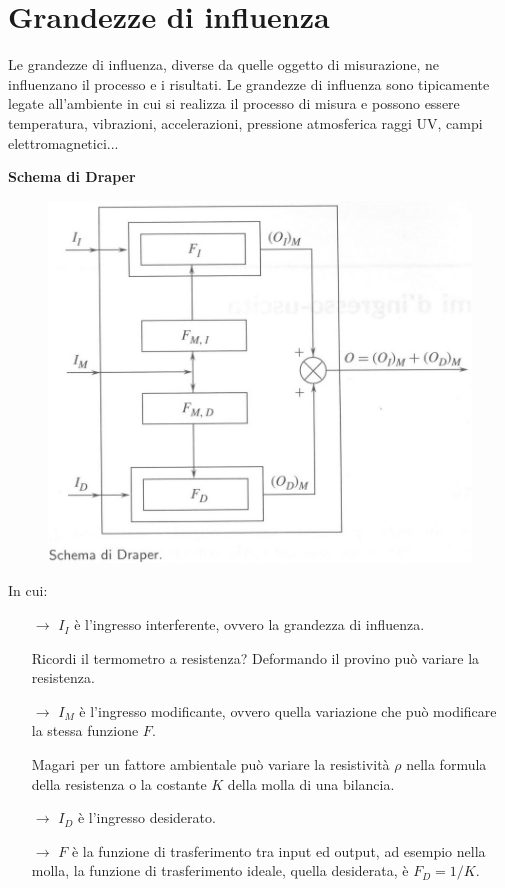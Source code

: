 \documentclass[a4paper, 15pt]{article}
\begin{document}
\section{Grandezze di influenza}	
\begin{adjustwidth}{2in}{}
	Le grandezze di influenza, diverse da quelle oggetto di misurazione, ne
	influenzano il processo e i risultati. 
	Le grandezze di influenza sono tipicamente legate all'ambiente in cui si
	realizza il processo di misura e possono essere temperatura, vibrazioni, accelerazioni, pressione atmosferica raggi UV, campi elettromagnetici... \newline 
	
	\textbf{Schema di Draper}  
	\begin{figure}[H]
		\centering
		\includegraphics[width=0.5\linewidth]{fig/screenshot028}
		\label{fig:screenshot028}
	\end{figure}	
	In cui:
	\begin{itemize}
		\item[$\rightarrow$] $I_I$ è l'ingresso interferente, ovvero la grandezza di influenza.
		
		Ricordi il termometro a resistenza? Deformando il provino può variare la resistenza. 
		
		\item[$\rightarrow$] $I_M$ è l'ingresso modificante, ovvero quella variazione che può modificare la stessa funzione $F$.
		
		Magari per un fattore ambientale può variare la resistività $\rho$ nella formula della resistenza o la costante $K$ della molla di una bilancia. 
		
		\item[$\rightarrow$] $I_D$ è l'ingresso desiderato.
		
		\item[$\rightarrow$]  $F$ è la funzione di trasferimento tra input ed output, ad esempio nella molla, la funzione di trasferimento ideale, quella desiderata, è $F_D = 1/K$.		
	\end{itemize} 


\end{adjustwidth}
\end{document}
